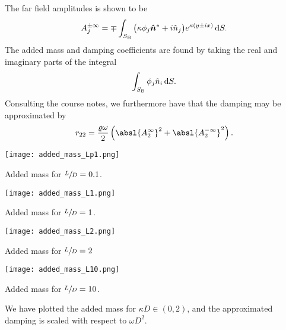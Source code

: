 The far field amplitudes is shown to be
\[
    A_j^{\pm \infty} = \mp \int_{S_{\mathrm{B}}} \big( \kappa \phi_j \bm{\hat{n}}^{\ast} + i\hat{n}_j \big) e^{\kappa(y \pm ix)} \,\mathrm{d} S.
\]
The added mass and damping coefficients are found by taking the real and imaginary parts of the integral
\[
    \int_{S_{\mathrm{B}}} \phi_j \hat{n}_i \,\mathrm{d} S.
\]
Consulting the course notes, we furthermore have that the damping may be approximated by
\[
    r_{22} = \frac{\varrho \omega}{2} \left( {\absl{A^{\infty}_{2}}}^2 + {\absl{A^{-\infty}_{2}}}^2 \right).
\]
\begin{Figure}
    \centering
    \captionsetup{type = figure}
    \texttt{[image: added\_mass\_Lp1.png]}
    \caption{Added mass for $\sfrac{L}{D} = 0.1$.}
\end{Figure}
\begin{Figure}
    \centering
    \captionsetup{type = figure}
    \texttt{[image: added\_mass\_L1.png]}
    \caption{Added mass for $\sfrac{L}{D} = 1$.}
\end{Figure}
\begin{Figure}
    \centering
    \captionsetup{type = figure}
    \texttt{[image: added\_mass\_L2.png]}
    \caption{Added mass for $\sfrac{L}{D} = 2$}
\end{Figure}
\begin{Figure}
    \centering
    \captionsetup{type = figure}
    \texttt{[image: added\_mass\_L10.png]}
    \caption{Added mass for $\sfrac{L}{D} = 10$.}
\end{Figure}
\noindent We have plotted the added mass for $\kappa D \in (0,2)$, and the approximated damping is scaled with respect to $\omega D^2$.
